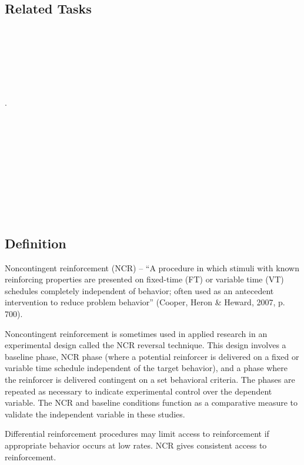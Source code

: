 \subsection{Related Tasks} 
\fourbTen{}\\
\fourcOne{}\\ 
\fourcTwo{}\\ 
\fourcThree{}\\
\fourdOne{}\\
\fourdTwo{}\\.
\fourdFifteen{}\\
\fourdSixteen{}\\
\fourdSeventeen{}\\
\fourdEighteen{}\\
\fourdTwenty{}\\
\fourdTwentyOne{}\\
\fouriSix{}\\
\fouriSeven{}\\
\fourjTwo{}\\
\fourjTen{}\\
%
%
%
%
%
%
%
\section[\fourdTwenty{}]{\fourdTwenty{}%
              }
\subsection{Definition}
Noncontingent reinforcement (NCR) – ``A procedure in which stimuli with known reinforcing properties are presented on fixed-time (FT) or variable time (VT) schedules completely independent of behavior; often used as an antecedent intervention to reduce problem behavior'' (Cooper, Heron \& Heward, 2007, p. 700).

Noncontingent reinforcement is sometimes used in applied research in an experimental design called the NCR reversal technique. This design involves a baseline phase, NCR phase (where a potential reinforcer is delivered on a fixed or variable time schedule independent of the target behavior), and a phase where the reinforcer is delivered contingent on a set behavioral criteria. The phases are repeated as necessary to indicate experimental control over the dependent variable. The NCR and baseline conditions function as a comparative measure to validate the independent variable in these studies.

Differential reinforcement procedures may limit access to reinforcement if appropriate behavior occurs at low rates. NCR gives consistent access to reinforcement. 
%
